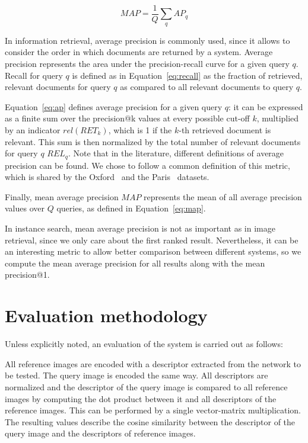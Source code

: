 \begin{equation}\label{eq:map}
MAP = \frac{1}{Q} \sum_q AP_q
\end{equation}

In information retrieval, average precision is commonly used, since it
allows to consider the order in which documents are returned by a system.
Average precision represents the area under the precision-recall curve
for a given query $q$. Recall for query $q$ is defined as in
Equation~\ref{eq:recall} as the fraction of retrieved, relevant documents
for query $q$ as compared to all relevant documents to query $q$.

Equation~\ref{eq:ap} defines average precision for a given query $q$:
it can be expressed as a finite sum
over the precision@k values at every possible cut-off $k$, multiplied by an
indicator $rel(RET_k)$, which is 1 if the $k$-th retrieved document is
relevant. This sum is then normalized by the total number of relevant
documents for query $q$ $REL_q$.
Note that in the literature, different definitions of average precision can
be found. We chose to follow a common definition of this metric, which
is shared by the Oxford~\cite{philbin_object_2007} and the
Paris~\cite{philbin_lost_2008} datasets.

Finally, mean average precision $MAP$ represents the mean of all average
precision values over $Q$ queries, as defined in Equation~\ref{eq:map}.

In instance search, mean average precision is not as important as in image retrieval,
since we only care about the first ranked result. Nevertheless, it can be an interesting
metric to allow better comparison between different systems, so we compute
the mean average precision for all results along with the mean precision@1.

\section{Evaluation methodology}\label{sec:evalmethod}
Unless explicitly noted, an evaluation of the system is carried out as
follows:

All reference images are encoded with a descriptor extracted from the
network to be tested. The query image is encoded the same way.
All descriptors are normalized and the descriptor of the query image
is compared to all reference images by computing the dot product between
it and all descriptors of the reference images. This can be performed
by a single vector-matrix multiplication. The resulting values describe
the cosine similarity between the descriptor of the query image
and the descriptors of reference images.

